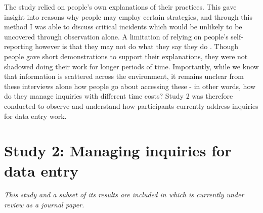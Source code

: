 The study relied on people's own explanations of their practices. This gave insight into reasons why people may employ certain strategies, and through this method I was able to discuss critical incidents which would be unlikely to be uncovered through observation alone. A limitation of relying on people's self-reporting however is that they may not do what they say they do \citep[e.g.][]{Randall2014}. Though people gave short demonstrations to support their explanations, they were not shadowed doing their work for longer periods of time. Importantly, while we know that information is scattered across the environment, it remains unclear from these interviews alone how people go about accessing these - in other words, how do they manage inquiries with different time costs? Study 2 was therefore conducted to observe and understand how participants currently address inquiries for data entry work.


\section{Study 2: Managing inquiries for data entry}\label{st:Study2}

\textit{This study and a subset of its results are included in \citet{Borghouts2018} which is currently under review as a journal paper.}

